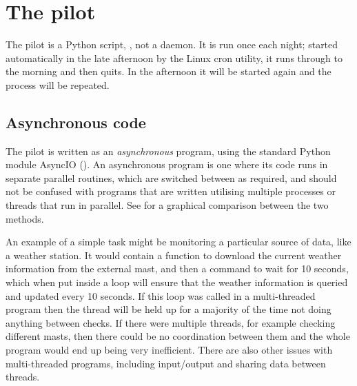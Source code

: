 \section{The pilot}
\label{sec:pilot}
\begin{colsection}


\begin{colsection}

The pilot is a Python script, , not a daemon. It is run once each night; started automatically in the late afternoon by the Linux cron utility, it runs through to the morning and then quits. In the afternoon it will be started again and the process will be repeated.

\end{colsection}


\subsection{Asynchronous code}
\label{sec:async}
\begin{colsection}

The pilot is written as an \textit{asynchronous} program, using the standard Python module AsyncIO (). An asynchronous program is one where its code runs in separate parallel routines, which are switched between as required, and should not be confused with programs that are written utilising multiple processes or threads that run in parallel. See  for a graphical comparison between the two methods.

An example of a simple task might be monitoring a particular source of data, like a weather station. It would contain a function to download the current weather information from the external mast, and then a  command to wait for 10 seconds, which when put inside a loop will ensure that the weather information is queried and updated every 10 seconds. If this loop was called in a multi-threaded program then the thread will be held up for a majority of the time not doing anything between checks. If there were multiple threads, for example checking different masts, then there could be no coordination between them and the whole program would end up being very inefficient. There are also other issues with multi-threaded programs, including input/output and sharing data between threads.


\end{colsection}
\end{colsection}
